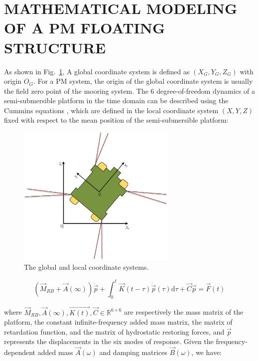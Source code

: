 \begin{sloppypar}
\section{MATHEMATICAL MODELING OF A PM FLOATING STRUCTURE}
\label{MATHEMATICAL MODELING}
As shown in Fig.~\ref{fig:coordinate}, A global coordinate system is defined as $(X_G, Y_G, Z_G)$ with origin $O_G$. For a PM system, the origin of the global coordinate system is usually the field zero point of the mooring system. The 6 degree-of-freedom dynamics of a semi-submersible platform in the time domain can be described using the Cummins equations \cite{cao2010effects}, which are defined in the local coordinate system $(X, Y, Z)$ fixed with respect to the mean position of the semi-submersible platform:

\begin{figure}[htbp]
	\centering
	\includegraphics[width=3.0in]{Images/coordinate_new.png}
	\caption{The global and local coordinate systems.}
	\label{fig:coordinate}
\end{figure}

\begin{equation}
(\vec{M}_{RB} + \vec{A}(\infty))\ddot{\vec{p}} + \int_{0}^{t}\vec{K}(t-\tau)\dot{\vec{p}}(\tau)\mathrm{d}\tau + \vec{C}\vec{p} = \vec{F}(t)
\end{equation}

\noindent where $\vec{M}_{RB}, \vec{A}(\infty), \vec{K(t)}, \vec{C} \in\mathbb{R}^{6\times6}$ are respectively the mass matrix of the platform, the constant infinite-frequency added mass matrix, the matrix of retardation function, and the matrix of hydrostatic restoring forces, and $\vec{p}$ represents the displacements in the six modes of response. Given the frequency-dependent added mass $\vec{A}(\omega)$ and damping matrices $\vec{B}(\omega)$, we have:


\end{sloppypar}
